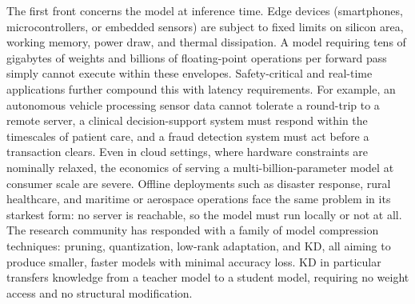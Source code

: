 \documentclass[12pt, a4paper, twoside]{book}
\numberwithin{equation}{chapter}
\theoremstyle{plain}
\theoremstyle{definition}
\theoremstyle{remark}
\newenvironment{foldable}{}{}
\begin{document}
\begin{foldable}
  The first front concerns the model at inference time.
  Edge devices (smartphones, microcontrollers, or embedded sensors) are subject to fixed limits on silicon area, working memory, power draw, and thermal dissipation.
  A model requiring tens of gigabytes of weights and billions of floating-point operations per forward pass simply cannot execute within these envelopes.
  Safety-critical and real-time applications further compound this with latency requirements.
  For example, an autonomous vehicle processing sensor data cannot tolerate a round-trip to a remote server, a clinical decision-support system must respond within the timescales of patient care, and a fraud detection system must act before a transaction clears.
  Even in cloud settings, where hardware constraints are nominally relaxed, the economics of serving a multi-billion-parameter model at consumer scale are severe.
  Offline deployments such as disaster response, rural healthcare, and maritime or aerospace operations face the same problem in its starkest form: no server is reachable, so the model must run locally or not at all.
  The research community has responded with a family of model compression techniques: pruning, quantization, low-rank adaptation, and \ac{KD}, all aiming to produce smaller, faster models with minimal accuracy loss.
  \ac{KD} in particular transfers knowledge from a teacher model to a student model, requiring no weight access and no structural modification.
\end{foldable}
\end{document}
